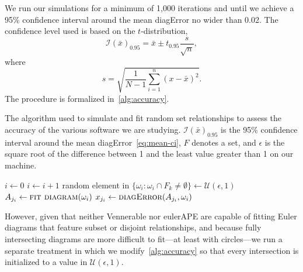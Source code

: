 \documentclass[
  oneside,
  openany,
  numbers=noendperiod,
  parskip=half,
  bibliography=totoc
]{scrbook}\usepackage[]{graphicx}\usepackage{xcolor}
\newcommand{\pkg}[1]{{\fontseries{b}\selectfont #1}}
\begin{document}
We run our simulations for a minimum of 1,000 iterations and until we achieve
a 95\% confidence interval around the mean diagError no wider than 0.02.
The confidence level used is based on the
$t$-distribution,
\begin{equation}
\mathcal{I}(\bar{x})_{0.95} = \bar{x} \pm t_{0.95}\frac{s}{\sqrt{n}},
\label{eq:mean-ci}
\end{equation}
where \[s = \sqrt{\frac{1}{N-1}\sum_{i=1}^n (x - \bar{x})^2}.\]
The procedure is formalized in~\cref{alg:accuracy}.

\begin{algorithm}[hbtp]
\caption{The algorithm used to simulate and fit random set relationships to assess
the accuracy of the various software we are studying. $\mathcal{I}(\bar{x})_{0.95}$
is the 95\% confidence interval around the mean diagError~\eqref{eq:mean-ci},
$F$ denotes a set, and
$\epsilon$ is the square root of the
difference between 1 and the least value greater than 1 on our machine.\label{alg:accuracy}}
\begin{algorithmic}
  \State $i \gets 0$
  \Do
    \State $i \gets i + 1$
      \State random element in $\{\omega_i : \omega_i \cap F_k \neq \emptyset\} \gets \mathcal{U}(\epsilon, 1)$
    \EndFor
      \State $A_{j_i} \gets \Call{fit diagram}{\omega_i}$
      \State $x_{j_i} \gets \Call{diagError}{A_{j_i},\omega_i}$
    \EndFor
\EndFor
\end{algorithmic}
\end{algorithm}

However, given that neither \pkg{Vennerable} nor \pkg{eulerAPE} are capable
of fitting Euler diagrams that feature subset or disjoint relationships, and
because fully intersecting diagrams are more difficult to fit---at least
with circles---we run a separate treatment
in which we modify~\cref{alg:accuracy} so that every intersection
is initialized to a value in $\mathcal{U}(\epsilon, 1)$.
\end{document}
